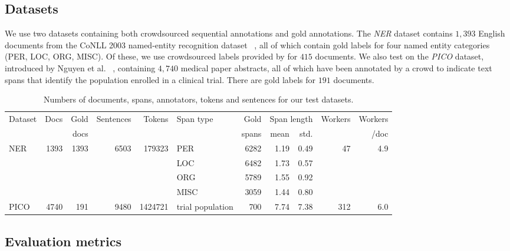 \subsection{Datasets}

We use two datasets containing both crowdsourced sequential annotations and gold annotations. 
The \emph{NER} dataset contains $1,393$ English documents from the CoNLL 2003 named-entity recognition dataset
~\cite{tjong2003introduction}, all of which contain gold labels for four named entity categories (PER, LOC, ORG, MISC). Of these, we use crowdsourced labels provided by \cite{rodrigues2014sequence} for $415$ documents.
We also test on the \emph{PICO} dataset, introduced by Nguyen et al. ~\cite{nguyen2017aggregating},
containing $4,740$ medical paper abstracts, all of which have been 
annotated by a crowd to indicate text spans that identify the population enrolled in a clinical trial. There are gold labels for $191$ documents.
\begin{table}
\small
\begin{tabular}{| l || r | r | r | r || l | r | r | r || r | r |} \hline
Dataset & Docs & Gold & Sentences & Tokens & Span type & Gold & \multicolumn{2}{c||}{Span length} & Workers & Workers \\
 & & docs &  & &  & spans & mean & std. & & /doc \\
\hline
NER & 1393 & 1393 & 6503 & 179323 & PER & 6282 & 1.19 & 0.49 & 47 & 4.9  \\
       & & & & & LOC  & 6482 & 1.73 & 0.57 & & \\
       & & & & & ORG  & 5789 & 1.55 & 0.92 & & \\
       & & & & & MISC & 3059 & 1.44 & 0.80 & & \\ \hline
PICO & 4740 & 191 & 9480 & 1424721 & trial population & 700 & 7.74 & 7.38 & 312 & 6.0  \\ \hline
\end{tabular}
\label{tab:datasets}
\caption{Numbers of documents, spans, annotators, tokens and sentences for our test datasets.}
\end{table}

\subsection{Evaluation metrics}

